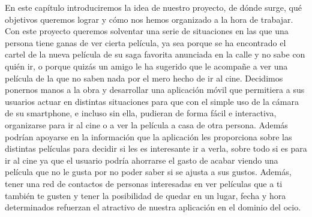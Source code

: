 \begin{flushleft}
    En este capítulo introduciremos la idea de nuestro proyecto, de dónde surge, qué objetivos queremos lograr y cómo nos hemos organizado a la hora de trabajar.
    Con este proyecto queremos solventar una serie de situaciones en las que una persona
    tiene ganas de ver cierta película, ya sea porque se ha encontrado el cartel de la nueva película
    de su saga favorita anunciada en la calle y no sabe con quién ir, o porque quizás un amigo le ha sugerido que le acompañe
    a ver una película de la que no saben nada por el mero hecho de ir al cine. 
    Decidimos ponernos manos a la obra y desarrollar una aplicación móvil que permitiera a sus usuarios actuar en distintas situaciones
    para que con el simple uso de la cámara de su smartphone, e incluso sin ella, pudieran de forma
    fácil e interactiva, organizarse para ir al cine o a ver la película a casa de otra persona. Además podrían apoyarse en la 
    información que la aplicación les proporciona sobre las distintas películas para decidir si les es interesante ir a verla, sobre todo 
    si es para ir al cine ya que el usuario podría ahorrarse el gasto de acabar viendo una película que no le gusta por no poder saber si se 
    ajusta a sus gustos. Además, tener una red de contactos de personas interesadas en ver películas que a ti también te gusten y tener la posibilidad
    de quedar en un lugar, fecha y hora determinados refuerzan el atractivo de nuestra aplicación en el dominio del ocio.
\end{flushleft}



